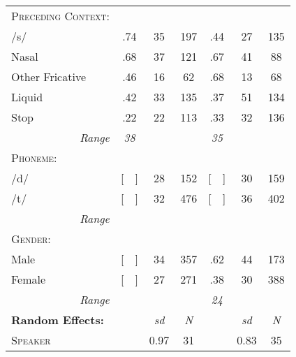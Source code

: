 \documentclass[
  10pt,
  letterpaper]{article}
\begin{document}
\begin{table}[h]
\begin{center}
\begin{tabular}{lcccccc}
\footnotesize{\textsc{Preceding Context:}}&&&&&&\\
/s/  & .74 & 35 & 197&.44&27&135\\
Nasal & .68 & 37 & 121&.67&41&88\\
Other Fricative & .46 & 16 & 62&.68&13&68\\
Liquid & .42 & 33 & 135&.37&51&134\\
Stop & .22 & 22 & 113&.33&32&136\\
\multicolumn{1}{r}{\footnotesize{\textit{Range}}}& \textit{38}&&&\textit{35}&&\\
\footnotesize{\textsc{Phoneme:}}&&&&&&\\
/d/ & [~~] & 28 & 152&[~~] &30&159\\
/t/ & [~~] & 32 & 476&[~~] &36&402\\
\multicolumn{1}{r}{\footnotesize{\textit{Range}}}& \textit{}&&\\
\footnotesize{\textsc{Gender:}}&&&&&&\\
Male & [~~] & 34 & 357&.62 &44&173\\
Female & [~~] & 27 & 271&.38 &30&388\\
\multicolumn{1}{r}{\footnotesize{\textit{Range}}}& \textit{}&&&\textit{24}&&\\
\midrule
\footnotesize{\textbf{Random Effects:}}&&\footnotesize{\textit{sd}}&\footnotesize{\textit{N}}&&\footnotesize{\textit{sd}}&\footnotesize{\textit{N}}\\
\cmidrule(lr){3-4}\cmidrule(lr){6-7}
\footnotesize{\textsc{Speaker}} & & 0.97& 31&&0.83&35\\
\bottomrule
\end{tabular}
\end{center}
\end{table}
\end{document}
